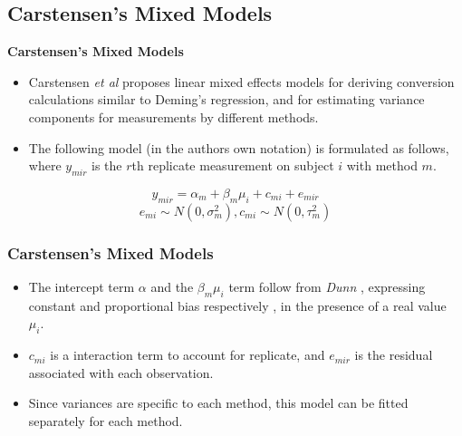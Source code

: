 \documentclass[compress]{beamer}        %
\makeatletter
\newcommand{\tcb}{\textcolor{beamer@blendedblue}}
\makeatother
\begin{document}
\subsection[Carstensen's Mixed Models]{Carstensen's Mixed Models}

\Large


\begin{frame}{\bf \tcb{Carstensen's Mixed Models}}
\begin{itemize}
\item Carstensen \textit{et al} \cite{BXC2004} proposes linear mixed effects models for deriving
conversion calculations similar to Deming's regression, and for
estimating variance components for measurements by different
methods. 
\end{itemize}
\end{frame}
\begin{frame}

\begin{itemize}
\item The following model (in the authors own notation) is
formulated as follows, where $y_{mir}$ is the $r$th replicate
measurement on subject $i$ with method $m$.
\end{itemize}
{
\LARGE
\begin{equation}
y_{mir}  = \alpha_{m} + \beta_{m}\mu_{i} + c_{mi} + e_{mir} 
\end{equation}
}
\vspace{0.3cm}
{
\normalsize
\[ e_{mi} \sim N(0,\sigma^{2}_{m}), c_{mi} \sim N(0,\tau^{2}_{m})\]
}
\end{frame}
\begin{frame}[fragile]
\frametitle{Carstensen's Mixed Models}
\begin{itemize}
\item The intercept term $\alpha$ and the $\beta_{m}\mu_{i}$ term follow
from \textit{Dunn} \cite{DunnSEME}, expressing constant and proportional bias
respectively , in the presence of a real value $\mu_{i}.$
\item $c_{mi}$ is a interaction term to account for replicate, and
 $e_{mir}$ is the residual associated with each observation.
\item Since variances are specific to each method, this model can be
fitted separately for each method.
\end{itemize}

\end{frame}
\end{document}

